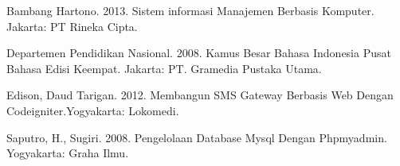 \documentclass{jtetiproposalskripsi}
\begin{document}
\begin{thebibliography}{9}

Bambang Hartono. 2013. Sistem informasi Manajemen Berbasis Komputer. Jakarta: PT Rineka Cipta.

Departemen Pendidikan Nasional. 2008. Kamus Besar Bahasa Indonesia Pusat Bahasa Edisi Keempat. Jakarta: PT. Gramedia Pustaka Utama.

Edison, Daud Tarigan. 2012. Membangun SMS Gateway Berbasis Web Dengan Codeigniter.Yogyakarta: Lokomedi.

Saputro, H., Sugiri. 2008. Pengelolaan Database Mysql Dengan Phpmyadmin. Yogyakarta: Graha Ilmu.

\end{thebibliography}
\end{document}
